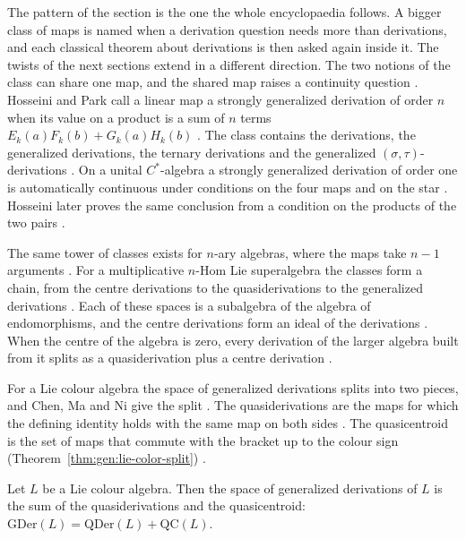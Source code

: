 The pattern of the section is the one the whole encyclopaedia follows.
A bigger class of maps is named when a derivation question needs more than
derivations, and each classical theorem about derivations is then asked again
inside it.
The twists of the next sections extend in a different direction.
The two notions of the class can share one map, and the shared map raises a
continuity question \cite[p.~1]{HosseiniPark2023}. Hosseini and Park
call a linear map a
strongly generalized derivation of order $n$ when its value on a product is a
sum of $n$ terms $E_k(a)F_k(b)+G_k(a)H_k(b)$
\cite[Definition~2.1, p.~3]{HosseiniPark2023}. The class contains the
derivations, the generalized derivations, the ternary derivations and the
generalized $(\sigma,\tau)$-derivations \cite[p.~2]{Hosseini2025Strongly}. On
a unital $C^{*}$-algebra a strongly generalized derivation of order one is
automatically continuous under conditions on the four maps and on the star
\cite[Theorem~2.9, p.~6]{HosseiniPark2023}. Hosseini later proves the
same conclusion from a condition on the products of the two pairs
\cite[Theorem~2.1, p.~5]{Hosseini2025Strongly}.

The same tower of classes exists for $n$-ary algebras, where the maps take
$n-1$ arguments \cite[p.~15]{ZhouFan2016nHom}. For a multiplicative $n$-Hom
Lie superalgebra the classes form a chain, from the centre derivations to the
quasiderivations to the generalized derivations \cite[Proposition~3.1,
p.~6]{ZhouFan2016nHom}. Each of these spaces is a subalgebra of the algebra of
endomorphisms, and the centre derivations form an ideal of the derivations
\cite[Proposition~3.1, p.~6]{ZhouFan2016nHom}. When the centre of the algebra
is zero, every derivation of the larger algebra built from it splits as a
quasiderivation plus a centre derivation \cite[Proposition~4.3,
p.~15]{ZhouFan2016nHom}.

For a Lie colour algebra the space of generalized derivations splits into two
pieces, and Chen, Ma and Ni give the split \cite[p.~923]{ChenMaNi2013}. The
quasiderivations are the maps for which the defining identity holds with the same
map on both sides \cite[Definition~1.5, p.~925]{ChenMaNi2013}. The quasicentroid
is the set of maps that commute with the bracket up to the colour sign (Theorem~\ref{thm:gen:lie-color-split})
\cite[Definition~1.7, p.~925]{ChenMaNi2013}.\begin{theorem}\label{thm:gen:lie-color-split}
Let $L$ be a Lie colour algebra. Then the space of generalized derivations of $L$
is the sum of the quasiderivations and the quasicentroid:
$\mathrm{GDer}(L)=\mathrm{QDer}(L)+\mathrm{QC}(L)$.
\end{theorem}

